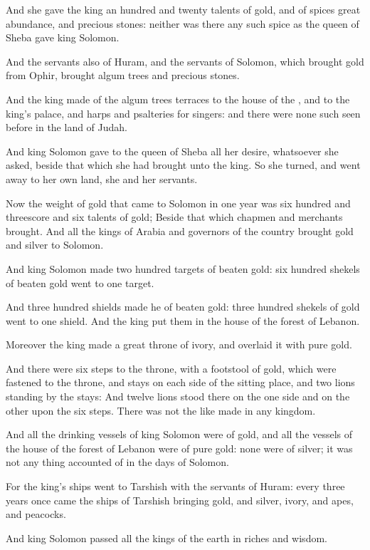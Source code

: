 \verse And she gave the king an hundred and twenty talents of gold, and of spices great abundance, and precious stones: neither was there any such spice as the queen of Sheba gave king Solomon.

\verse And the servants also of Huram, and the servants of Solomon, which brought gold from Ophir, brought algum trees and precious stones.

\verse And the king made of the algum trees terraces to the house of the \LORD, and to the king's palace, and harps and psalteries for singers: and there were none such seen before in the land of Judah.

\verse And king Solomon gave to the queen of Sheba all her desire, whatsoever she asked, beside that which she had brought unto the king.  So she turned, and went away to her own land, she and her servants.

\verse Now the weight of gold that came to Solomon in one year was six hundred and threescore and six talents of gold; \verse Beside that which chapmen and merchants brought. And all the kings of Arabia and governors of the country brought gold and silver to Solomon.

\verse And king Solomon made two hundred targets of beaten gold: six hundred shekels of beaten gold went to one target.

\verse And three hundred shields made he of beaten gold: three hundred shekels of gold went to one shield. And the king put them in the house of the forest of Lebanon.

\verse Moreover the king made a great throne of ivory, and overlaid it with pure gold.

\verse And there were six steps to the throne, with a footstool of gold, which were fastened to the throne, and stays on each side of the sitting place, and two lions standing by the stays: \verse And twelve lions stood there on the one side and on the other upon the six steps.  There was not the like made in any kingdom.

\verse And all the drinking vessels of king Solomon were of gold, and all the vessels of the house of the forest of Lebanon were of pure gold: none were of silver; it was not any thing accounted of in the days of Solomon.

\verse For the king's ships went to Tarshish with the servants of Huram: every three years once came the ships of Tarshish bringing gold, and silver, ivory, and apes, and peacocks.

\verse And king Solomon passed all the kings of the earth in riches and wisdom.

